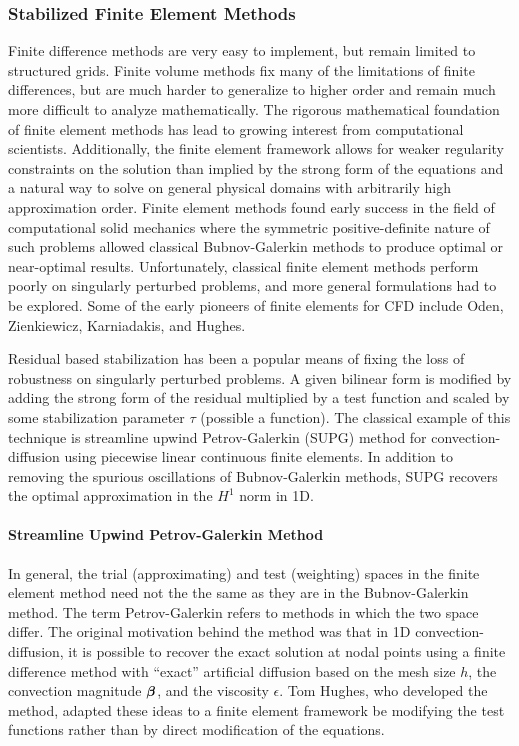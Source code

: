 \documentclass[Proposal.tex]{subfiles}
\begin{document}
\subsubsection{Stabilized Finite Element Methods}
Finite difference methods are very easy to implement, but remain limited to structured grids. 
Finite volume methods fix many of the limitations of finite differences, 
but are much harder to generalize to higher order and remain much more difficult to analyze mathematically. 
The rigorous mathematical foundation of finite element methods has lead to growing interest from computational scientists.
Additionally, the finite element framework allows for weaker regularity constraints on the solution than implied by the strong form of the equations 
and a natural way to solve on general physical domains with arbitrarily high approximation order.
Finite element methods found early success in the field of computational solid mechanics where the symmetric positive-definite nature of such problems
allowed classical Bubnov-Galerkin methods to produce optimal or near-optimal results.
Unfortunately, classical finite element methods perform poorly on singularly perturbed problems, 
and more general formulations had to be explored.
Some of the early pioneers of finite elements for CFD include Oden, Zienkiewicz, Karniadakis, and Hughes\cite{ChungCFD}.

Residual based stabilization has been a popular means of fixing the loss of robustness on singularly perturbed problems.
A given bilinear form is modified by adding the strong form of the residual multiplied by a test function and scaled by some
stabilization parameter $\tau$ (possible a function).
The classical example of this technique is streamline upwind Petrov-Galerkin (SUPG) method for convection-diffusion using piecewise linear
continuous finite elements\cite{SUPG}.
In addition to removing the spurious oscillations of Bubnov-Galerkin methods, SUPG recovers the optimal approximation in the $H^1$ norm in 1D.

\paragraph{Streamline Upwind Petrov-Galerkin Method}
In general, the trial (approximating) and test (weighting) spaces in the finite element method need not the the same as they are in the Bubnov-Galerkin method.
The term Petrov-Galerkin refers to methods in which the two space differ.
The original motivation behind the method was that in 1D convection-diffusion, it is possible to recover the exact solution at nodal points 
using a finite difference method with ``exact'' artificial diffusion based on the mesh size $h$, 
the convection magnitude $\boldsymbol\beta$, and the viscosity $\epsilon$.
Tom Hughes, who developed the method, adapted these ideas to a finite element framework be modifying the test functions rather than by direct
modification of the equations.
\end{document}
